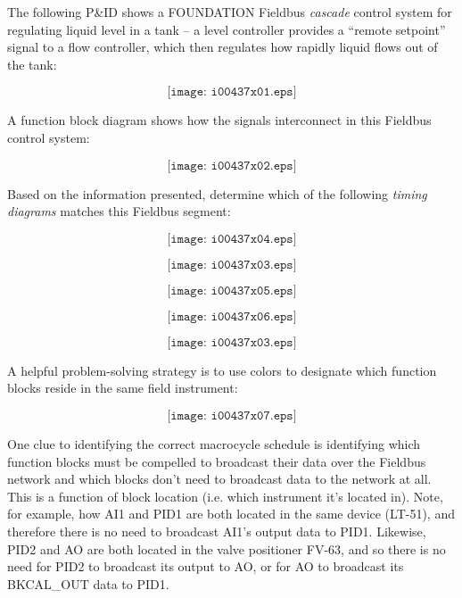 

The following P\&ID shows a FOUNDATION Fieldbus {\it cascade} control system for regulating liquid level in a tank -- a level controller provides a ``remote setpoint'' signal to a flow controller, which then regulates how rapidly liquid flows out of the tank:

$$\texttt{[image: i00437x01.eps]}$$

A function block diagram shows how the signals interconnect in this Fieldbus control system:

$$\texttt{[image: i00437x02.eps]}$$

\filbreak

Based on the information presented, determine which of the following {\it timing diagrams} matches this Fieldbus segment:

$$\texttt{[image: i00437x04.eps]}$$

$$\texttt{[image: i00437x03.eps]}$$  %

$$\texttt{[image: i00437x05.eps]}$$ 

$$\texttt{[image: i00437x06.eps]}$$ 







$$\texttt{[image: i00437x03.eps]}$$  %







A helpful problem-solving strategy is to use colors to designate which function blocks reside in the same field instrument:

$$\texttt{[image: i00437x07.eps]}$$  

One clue to identifying the correct macrocycle schedule is identifying which function blocks must be compelled to broadcast their data over the Fieldbus network and which blocks don't need to broadcast data to the network at all.  This is a function of block location (i.e. which instrument it's located in).  Note, for example, how AI1 and PID1 are both located in the same device (LT-51), and therefore there is no need to broadcast AI1's output data to PID1.  Likewise, PID2 and AO are both located in the valve positioner FV-63, and so there is no need for PID2 to broadcast its output to AO, or for AO to broadcast its BKCAL\_OUT data to PID1.


